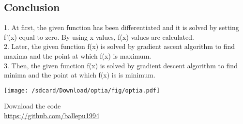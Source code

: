 \documentclass[10pt,a4paper]{report}
\begin{document}
\begin{multicols}{2}
    \section{Conclusion}
\begin{flushleft}
1. At first, the given function has been differentiated and it is solved by setting f'(x) equal to zero. By using x values, f(x) values are calculated.\\
\vspace{0.25cm}
2. Later, the given function f(x) is solved by gradient ascent algorithm to find maxima and the point at which f(x) is maximum.\\
\vspace{0.25cm}
3. Then, the given function f(x) is solved by gradient descent algorithm to find minima and the point at which f(x) is is minimum.\\
\vspace{0.25cm}
\end{flushleft}  
\texttt{[image: /sdcard/Download/optia/fig/optia.pdf]} 
\raggedright  Download the code \\
\url{https://github.com/ballepu1994}
  \end{multicols}
\end{document}
